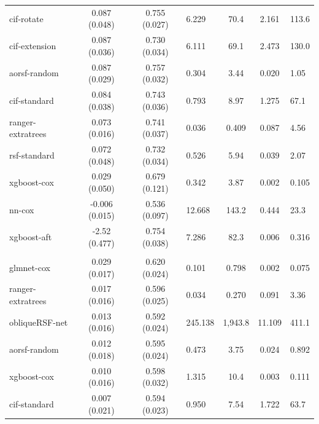 \documentclass[twoside,11pt]{article}\usepackage[]{graphicx}\usepackage[]{xcolor}
\newenvironment{knitrout}{}{} %
\begin{document}
\begin{knitrout}
\begin{longtable}{lcclccl}
\hspace{1em}cif-rotate & 0.087 (0.048) & 0.755 (0.027) & 6.229 & 70.4 & 2.161 & 113.6\\
\hspace{1em}cif-extension & 0.087 (0.036) & 0.730 (0.034) & 6.111 & 69.1 & 2.473 & 130.0\\
\hspace{1em}aorsf-random & 0.087 (0.029) & 0.757 (0.032) & 0.304 & 3.44 & 0.020 & 1.05\\
\hspace{1em}cif-standard & 0.084 (0.038) & 0.743 (0.036) & 0.793 & 8.97 & 1.275 & 67.1\\
\hspace{1em}ranger-extratrees & 0.073 (0.016) & 0.741 (0.037) & 0.036 & 0.409 & 0.087 & 4.56\\
\hspace{1em}rsf-standard & 0.072 (0.048) & 0.732 (0.034) & 0.526 & 5.94 & 0.039 & 2.07\\
\hspace{1em}xgboost-cox & 0.029 (0.050) & 0.679 (0.121) & 0.342 & 3.87 & 0.002 & 0.105\\
\hspace{1em}nn-cox & -0.006 (0.015) & 0.536 (0.097) & 12.668 & 143.2 & 0.444 & 23.3\\
\hspace{1em}xgboost-aft & -2.52 (0.477) & 0.754 (0.038) & 7.286 & 82.3 & 0.006 & 0.316\\
\addlinespace[0.3em]
\hline
\multicolumn{7}{l}{\textit{\textbf{FCL; relapse, n = 541, p = 7}}}\\
\hline
\hspace{1em}glmnet-cox & 0.029 (0.017) & 0.620 (0.024) & 0.101 & 0.798 & 0.002 & 0.075\\
\hspace{1em}ranger-extratrees & 0.017 (0.016) & 0.596 (0.025) & 0.034 & 0.270 & 0.091 & 3.36\\
\hspace{1em}obliqueRSF-net & 0.013 (0.016) & 0.592 (0.024) & 245.138 & 1,943.8 & 11.109 & 411.1\\
\hspace{1em}aorsf-random & 0.012 (0.018) & 0.595 (0.024) & 0.473 & 3.75 & 0.024 & 0.892\\
\hspace{1em}xgboost-cox & 0.010 (0.016) & 0.598 (0.032) & 1.315 & 10.4 & 0.003 & 0.111\\
\hspace{1em}cif-standard & 0.007 (0.021) & 0.594 (0.023) & 0.950 & 7.54 & 1.722 & 63.7\\

\end{longtable}
\end{knitrout}
\end{document}
